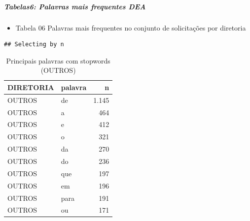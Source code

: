 \documentclass[]{article}
\newenvironment{Shaded}{\begin{snugshade}}{\end{snugshade}}
\newcommand{\KeywordTok}[1]{\textcolor[rgb]{0.13,0.29,0.53}{\textbf{#1}}}
\newcommand{\DataTypeTok}[1]{\textcolor[rgb]{0.13,0.29,0.53}{#1}}
\newcommand{\DecValTok}[1]{\textcolor[rgb]{0.00,0.00,0.81}{#1}}
\newcommand{\StringTok}[1]{\textcolor[rgb]{0.31,0.60,0.02}{#1}}
\newcommand{\OperatorTok}[1]{\textcolor[rgb]{0.81,0.36,0.00}{\textbf{#1}}}
\newcommand{\NormalTok}[1]{#1}
\providecommand{\tightlist}{%
  \setlength{\itemsep}{0pt}\setlength{\parskip}{0pt}}
\let\oldsubparagraph\subparagraph
\renewcommand{\subparagraph}[1]{\oldsubparagraph{#1}\mbox{}}
\begin{document}
\subparagraph{Tabelas6: Palavras mais frequentes
DEA}\label{tabelas6-palavras-mais-frequentes-dea}

\begin{itemize}
\tightlist
\item
  Tabela 06 Palavras mais frequentes no conjunto de solicitações por
  diretoria
\end{itemize}

\begin{Shaded}
\end{Shaded}

\begin{verbatim}
## Selecting by n
\end{verbatim}

\begin{table}[!h]

\caption{\label{tab:unnamed-chunk-26}Principais palavras com stopwords (OUTROS)}
\centering
\begin{tabular}{llr}
\toprule
DIRETORIA & palavra & n\\
\midrule
\rowcolor{gray!6}  OUTROS & de & 1.145\\
OUTROS & a & 464\\
\rowcolor{gray!6}  OUTROS & e & 412\\
OUTROS & o & 321\\
\rowcolor{gray!6}  OUTROS & da & 270\\
\addlinespace
OUTROS & do & 236\\
\rowcolor{gray!6}  OUTROS & que & 197\\
OUTROS & em & 196\\
\rowcolor{gray!6}  OUTROS & para & 191\\
OUTROS & ou & 171\\
\bottomrule
\end{tabular}
\end{table}
\end{document}

